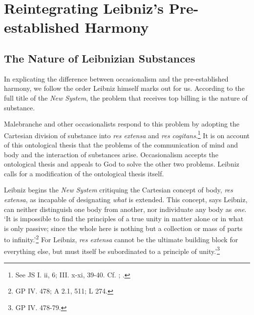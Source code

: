 \documentclass{article}
\begin{document}
\section{Reintegrating Leibniz's Pre-established
Harmony}

\subsection{The Nature of Leibnizian
Substances}

In explicating the difference between occasionalism and the
pre-established harmony, we follow the order Leibniz himself marks out
for us. According to the full title of the \emph{New System}, the
problem that receives top billing is the nature of substance.

Malebranche and other occasionalists respond to this problem by adopting
the Cartesian division of substance into \emph{res extensa} and
\emph{res cogitans}.\footnote{See JS I. ii, 6; III. x-xi, 39-40. Cf.
  \autocite{Bardout2000}; \autocite[247-249]{Pessin2004}.} It is on account of this
ontological thesis that the problems of the communication of mind and
body and the interaction of substances arise. Occasionalism accepts the
ontological thesis and appeals to God to solve the other two problems.
Leibniz calls for a modification of the ontological thesis itself.

Leibniz begins the \emph{New System} critiquing the Cartesian concept of
body, \emph{res extensa}, as incapable of designating \emph{what} is
extended. This concept, says Leibniz, can neither distinguish one body
from another, nor individuate any body as \emph{one}. `It is impossible
to find the principles of a true unity in matter alone or in what is
only passive; since the whole here is nothing but a collection or mass
of parts to infinity.'\footnote{GP IV. 478; A 2.1, 511; L 274.} For
Leibniz, \emph{res extensa} cannot be the ultimate building block for
everything else, but must itself be subordinated to a principle of
unity.'\footnote{GP IV. 478-79.}
\end{document}
